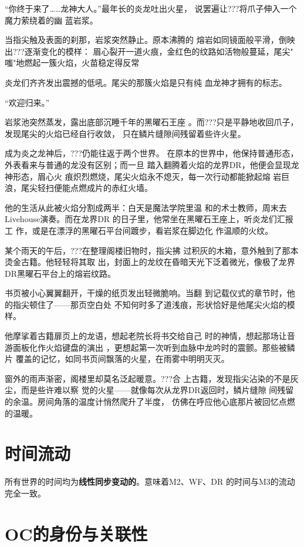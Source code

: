 \documentclass[lang=cn,newtx,10pt,scheme=chinese]{elegantbook}
\newcommand{\dr}{???}
\begin{document}
“你终于来了……龙神大人。”最年长的炎龙吐出火星，
说罢遍让\dr{}将爪子伸入一个魔力萦绕着的幽
蓝岩浆。

当指尖触及表面的刹那，岩浆突然静止。原本沸腾的
熔岩如同镜面般平滑，倒映出\dr{}逐渐变化的模样：
眉心裂开一道火痕，金红色的纹路如活物般蔓延，尾尖"
嗤"地燃起一簇火焰，火苗稳定得反常

炎龙们齐齐发出震撼的低吼。尾尖的那簇火焰是只有纯
血龙神才拥有的标志。

“欢迎归来。”

岩浆池突然蒸发，露出底部沉睡千年的黑曜石王座
。而\dr{}只是平静地收回爪子，
发现尾尖的火焰已经自行收敛，
只在鳞片缝隙间残留着些许火星。

成为炎之龙神后，\dr{}仍能往返于两个世界。
在原本的世界中，他保持普通形态，外表看来与普通的龙没有区别；而一旦
踏入翻腾着火焰的龙界DR，他便会显现龙神形态，眉心火
痕炽烈燃烧，尾尖火焰永不熄灭，每一次行动都能掀起熔
岩巨浪，尾尖轻扫便能点燃成片的赤红火墙。

他的生活从此被火焰分割成两半：白天是魔法学院里温
和的术士教师，周末去Livehouse演奏。而在龙界DR
的日子里，他常坐在黑曜石王座上，听炎龙们汇报工
作，或是在漂浮的黑曜石平台间踱步，看岩浆在脚边化
作温顺的火纹。

某个雨天的午后，\dr{}在整理阁楼旧物时，指尖拂
过积灰的木箱，意外触到了那本烫金古籍。他轻轻将其取
出，封面上的龙纹在昏暗天光下泛着微光，像极了龙界
DR黑曜石平台上的熔岩纹路。​

书页被小心翼翼翻开，干燥的纸页发出轻微脆响。当翻
到记载仪式的章节时，他的指尖顿住了——那页空白处
不知何时多了道浅痕，形状恰好是他尾尖火焰的模样。

他摩挲着古籍扉页上的龙语，想起老院长将书交给自己
时的神情，想起那场让音游面板化作火焰键盘的演出
，更想起第一次听到血脉中龙吟时的震颤。那些被鳞片
覆盖的记忆，如同书页间飘落的火星，在雨雾中明明灭灭。​

窗外的雨声渐密，阁楼里却莫名泛起暖意。\dr{}合
上古籍，发现指尖沾染的不是灰尘，而是些许难以察
觉的火星——就像每次从龙界DR返回时，鳞片缝隙
间残留的余温。房间角落的温度计悄然爬升了半度，
仿佛在呼应他心底那片被回忆点燃的温暖。

\section{时间流动}
所有世界的时间均为\textbf{线性同步变动的}。意味着M2、WF、DR
的时间与M3的流动完全一致。

\section{OC的身份与关联性}
\end{document}
